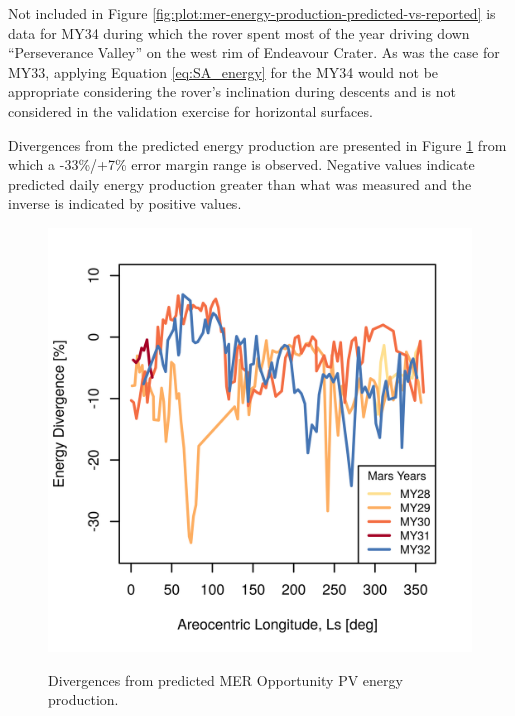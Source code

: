 
Not included in Figure \ref{fig:plot:mer-energy-production-predicted-vs-reported} is data for MY34 during which the rover spent most of the year driving down ``Perseverance Valley'' on the west rim of Endeavour Crater. As was the case for MY33, applying Equation \ref{eq:SA_energy} for the MY34 would not be appropriate considering the rover's inclination during descents and is not considered in the validation exercise for horizontal surfaces.


Divergences from the predicted energy production are presented in Figure \ref{fig:plot:mer-energy-prediction-divergences} from which a -33\%/+7\% error margin range is observed. Negative values indicate predicted daily energy production greater than what was measured and the inverse is indicated by positive values.

\begin{figure}[h]
  \centering
  \hypersetup{linkcolor=captionTextColor}
  \includegraphics[width=0.8\linewidth]{sections/power-and-energy-predictions/plots/energy-prediction-divergences-from-my28-to-my32.png}\\
  \caption[Divergences from predicted MER Opportunity PV energy production]
          {Divergences from predicted MER Opportunity PV energy production.}
  \label{fig:plot:mer-energy-prediction-divergences}
\end{figure}

